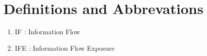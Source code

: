 \chapter{Definitions and Abbrevations}
\label{chapter:DetailedDescriptions}
\begin{enumerate}
\item IF : Information Flow
\item IFE : Information Flow Exposure

\end{enumerate}